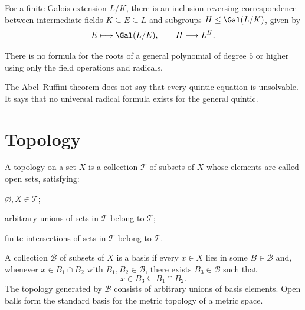     \begin{theorem}
        For a finite Galois extension $L/K$, there is an inclusion-reversing
        correspondence between intermediate fields $K\subseteq E\subseteq L$ and
        subgroups $H\leq \Gal(L/K)$, given by
        \[
            E\longmapsto \Gal(L/E),
            \qquad
            H\longmapsto L^H.
        \]
    \end{theorem}

    \begin{theorem}
        There is no formula for the roots of a general polynomial of degree $5$
        or higher using only the field operations and radicals.
    \end{theorem}

    \begin{remark}
        The Abel--Ruffini theorem does not say that every quintic equation is
        unsolvable. It says that no universal radical formula exists for the
        general quintic.
    \end{remark}

    \chapter{Topology}



    \begin{definition}[Topology]
        A topology on a set $X$ is a collection $\mathcal{T}$ of subsets of $X$
        whose elements are called open sets, satisfying:
        \begin{conditionlist}
            \item $\varnothing,X\in\mathcal{T}$;
            \item arbitrary unions of sets in $\mathcal{T}$ belong to
            $\mathcal{T}$;
            \item finite intersections of sets in $\mathcal{T}$ belong to
            $\mathcal{T}$.
        \end{conditionlist}
    \end{definition}


    \begin{definition}
        A collection $\mathcal{B}$ of subsets of $X$ is a basis if every
        $x\in X$ lies in some $B\in\mathcal{B}$ and, whenever
        $x\in B_1\cap B_2$ with $B_1,B_2\in\mathcal{B}$, there exists
        $B_3\in\mathcal{B}$ such that
        \[
            x\in B_3\subseteq B_1\cap B_2.
        \]
        The topology generated by $\mathcal{B}$ consists of arbitrary unions
        of basis elements. Open balls form the standard basis for the metric
        topology of a metric space.
    \end{definition}


